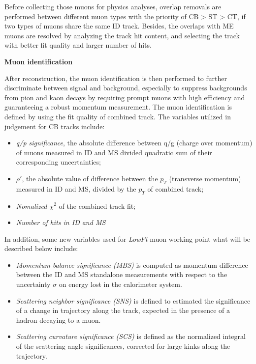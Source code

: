 Before collecting those muons for physics analyses, overlap removals are performed between different muon types with the priority of CB > ST > CT, if two types of muons share the same ID track.
Besides, the overlaps with ME muons are resolved by analyzing the track hit content, and selecting the track with better fit quality and larger number of hits.

\textbf{Muon identification}

After reconstruction, the muon identification is then performed to further discriminate between signal and background, especially to suppress backgrounds from pion and kaon decays by requiring prompt muons with high efficiency and guaranteeing a robust momentum measurement.
The muon identification is defined by using the fit quality of combined track. 
The variables utilized in judgement for CB tracks include:
\begin{itemize}
	\item \textit{q/p significance}, the absolute difference between q/g (charge over momentum) of muons measured in ID and MS divided quadratic sum of their corresponding uncertainties;
	\item \textit{$\rho'$}, the absolute value of difference between the $p_{T}$ (transverse momentum) measured in ID and MS, divided by the $p_{T}$ of combined track;
	\item \textit{Nomalized $\chi^{2}$} of the combined track fit;
	\item \textit{Number of hits in ID and MS}
\end{itemize}
In addition, some new variables used for \textit{LowPt} muon working point what will be described below include\cite{Zheng:2649299}:
\begin{itemize}
	\item \textit{Momentum balance significance (MBS) } is computed as momentum difference between the ID and MS standalone measurements with respect to the uncertainty $\sigma$ on energy lost in the calorimeter system.
	\item \textit{Scattering neighbor significance (SNS)} is defined to estimated the significance of a change in trajectory along the track, expected in the presence of a hadron decaying to a muon.
	\item \textit{Scattering curvature significance (SCS)} is defined as the normalized integral of the scattering angle significances, corrected for large kinks along the trajectory.
\end{itemize}

